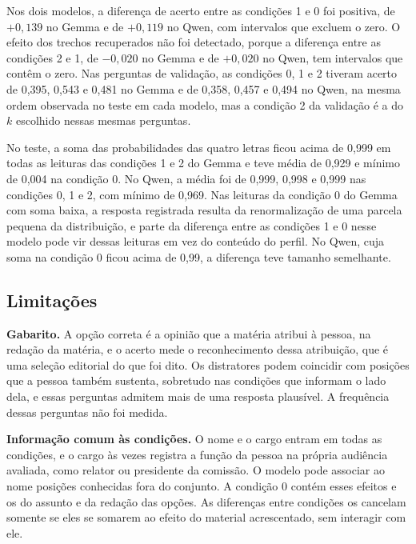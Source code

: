 Nos dois modelos, a diferença de acerto entre as condições 1 e 0 foi positiva, de $+0{,}139$ no
Gemma e de $+0{,}119$ no Qwen, com intervalos que excluem o zero. O efeito dos trechos recuperados
não foi detectado, porque a diferença entre as condições 2 e 1, de $-0{,}020$ no Gemma e de
$+0{,}020$ no Qwen, tem intervalos que contêm o zero. Nas perguntas de validação, as condições 0, 1 e
2 tiveram acerto de 0,395, 0,543 e 0,481 no Gemma e de 0,358, 0,457 e 0,494 no Qwen, na mesma ordem
observada no teste em cada modelo, mas a condição 2 da validação é a do $k$ escolhido nessas mesmas
perguntas.

No teste, a soma das probabilidades das quatro letras ficou acima de 0,999 em todas as leituras das
condições 1 e 2 do Gemma e teve média de 0,929 e mínimo de 0,004 na condição 0. No Qwen, a média foi
de 0,999, 0,998 e 0,999 nas condições 0, 1 e 2, com mínimo de 0,969. Nas leituras da condição 0 do
Gemma com soma baixa, a resposta registrada resulta da renormalização de uma parcela pequena da
distribuição, e parte da diferença entre as condições 1 e 0 nesse modelo pode vir dessas leituras em
vez do conteúdo do perfil. No Qwen, cuja soma na condição 0 ficou acima de 0,99, a diferença teve
tamanho semelhante.


\subsection{Limitações}
\label{sec:limitacoes}

\textbf{Gabarito.} A opção correta é a opinião que a matéria atribui à pessoa, na redação da
matéria, e o acerto mede o reconhecimento dessa atribuição, que é uma seleção editorial do que foi
dito. Os distratores podem coincidir com posições que a pessoa também sustenta, sobretudo nas
condições que informam o lado dela, e essas perguntas admitem mais de uma resposta plausível. A
frequência dessas perguntas não foi medida.

\textbf{Informação comum às condições.} O nome e o cargo entram em todas as condições, e o cargo às
vezes registra a função da pessoa na própria audiência avaliada, como relator ou presidente da
comissão. O modelo pode associar ao nome posições conhecidas fora do conjunto. A condição 0 contém
esses efeitos e os do assunto e da redação das opções. As diferenças entre condições os cancelam
somente se eles se somarem ao efeito do material acrescentado, sem interagir com ele.

